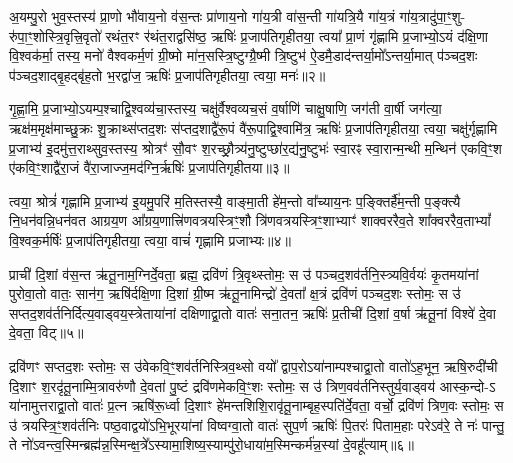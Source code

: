 {\anuvakamend[{योनौ॒ पञ्च॑दश च॥१॥}]}

अ॒यम्पु॒रो भुव॒स्तस्य॑ प्रा॒णो भौ॑वाय॒नो व॑स॒न्तः प्रा॑णाय॒नो गा॑य॒त्री वा॑स॒न्ती गा॑यत्रि॒यै गा॑य॒त्रं गा॑य॒त्रादु॑पा॒ꣳ॒शु- रु॑पा॒ꣳ॒शोस्त्रि॒वृत्त्रि॒वृतो॑ रथंत॒रꣳ र॑थंत॒राद्वसि॑ष्ठ॒ ऋषिः॑ प्र॒जाप॑तिगृहीतया॒ त्वया᳚ प्रा॒णं गृ॑ह्णामि प्र॒जाभ्यो॒\-ऽयं द॑क्षि॒णा वि॒श्वक॑र्मा॒ तस्य॒ मनो॑ वैश्वकर्म॒णं ग्री॒ष्मो मा॑न॒सस्त्रि॒ष्टुग्ग्रै॒ष्मी त्रि॒ष्टुभ॑ ऐ॒डमै॒डाद॑न्तर्या॒मो᳚\-ऽन्तर्या॒मात् प॑ञ्चद॒शः प॑ञ्चद॒शाद्बृ॒हद्बृ॑ह॒तो भ॒रद्वा॑ज॒ ऋषिः॑ प्र॒जाप॑तिगृहीतया॒ त्वया॒ मनः॑॥२॥

गृ॒ह्णा॒मि॒ प्र॒जाभ्यो॒\-ऽयम्प॒श्चाद्वि॒श्वव्य॑चा॒स्तस्य॒ चक्षु॑र्वैश्वव्यच॒सं व॒र्\mbox{}षाणि॑ चाक्षु॒षाणि॒ जग॑ती वा॒र्\mbox{}षी जग॑त्या॒ ऋक्ष॑म॒मृक्ष॑माच्छु॒क्रः शु॒क्राथ्स॑प्तद॒शः स॑प्तद॒शाद्वै॑रू॒पं वै॑रू॒पाद्वि॒श्वामि॑त्र॒ ऋषिः॑ प्र॒जाप॑तिगृहीतया॒ त्वया॒ चक्षु॑र्गृह्णामि प्र॒जाभ्य॑ इ॒दमु॑त्त॒राथ्सुव॒स्तस्य॒ श्रोत्रꣳ॑ सौ॒वꣳ श॒रच्छ्रौ॒त्र्य॑नु॒ष्टुप्छा॑र॒द्य॑नु॒ष्टुभः॑ स्वा॒रꣴ स्वा॒रान्म॒न्थी म॒न्थिन॑ एकवि॒ꣳ॒श ए॑कवि॒ꣳ॒शाद्वै॑रा॒जं वै॑रा॒जाज्ज॒मद॑ग्नि॒र्\mbox{}ऋषिः॑ प्र॒जाप॑तिगृहीतया॥३॥

त्वया॒ श्रोत्रं॑ गृह्णामि प्र॒जाभ्य॑ इ॒यमु॒परि॑ म॒तिस्तस्यै॒ वाङ्मा॒ती हे॑म॒न्तो वा᳚च्याय॒नः प॒ङ्क्तिर्\mbox{}है॑म॒न्ती प॒ङ्क्त्यै नि॒धन॑वन्नि॒धन॑वत आग्रय॒ण आ᳚ग्रय॒णात्त्रि॑णवत्रयस्त्रिꣳ॒शौ त्रि॑णवत्रयस्त्रिꣳ॒शाभ्याꣳ॑ शाक्वररैव॒ते शा᳚क्वररैव॒ता\-भ्यां᳚ वि॒श्वक॒र्मर्\mbox{}षिः॑ प्र॒जाप॑तिगृहीतया॒ त्वया॒ वाचं॑ गृह्णामि प्रजाभ्यः॥४॥

{\anuvakamend[{त्वया॒ मनो॑ ज॒मद॑ग्नि॒र्\mbox{}ऋषिः॑ प्र॒जाप॑तिगृहीतया त्रि॒ꣳ॒शच्च॑॥२॥}]}

प्राची॑ दि॒शां व॑स॒न्त ऋ॑तू॒नाम॒ग्निर्दे॒वता॒ ब्रह्म॒ द्रवि॑णं त्रि॒वृथ्स्तोमः॒ स उ॑ पञ्चद॒शव॑र्तनि॒स्त्र्यवि॒र्वयः॑ कृ॒तमया॑नां पुरोवा॒तो वातः॒ सान॑ग॒ ऋषि॑र्दक्षि॒णा दि॒शां ग्री॒ष्म ऋ॑तू॒नामिन्द्रो॑ दे॒वता᳚ क्ष॒त्रं द्रवि॑णं पञ्चद॒शः स्तोमः॒ स उ॑ सप्तद॒शव॑र्तनिर्दित्य॒वाड्वय॒स्त्रेताया॑नां दक्षिणाद्वा॒तो वातः॑ सना॒तन॒ ऋषिः॑ प्र॒तीची॑ दि॒शां व॒र्\mbox{}षा ऋ॑तू॒नां विश्वे॑ दे॒वा दे॒वता॒ विट्॥५॥

द्रवि॑णꣳ सप्तद॒शः स्तोमः॒ स उ॑वेकवि॒ꣳ॒शव॑र्तनिस्त्रिव॒थ्सो वयो᳚ द्वाप॒रो\-ऽया॑नाम्पश्चाद्वा॒तो वातो॑\-ऽह॒भून॒ ऋषि॒रुदी॑ची दि॒शाꣳ श॒रदृ॑तू॒नाम्मि॒त्रावरु॑णौ दे॒वता॑ पु॒ष्टं द्रवि॑णमेकवि॒ꣳ॒शः स्तोमः॒ स उ॑ त्रिण॒वव॑र्तनिस्तुर्य॒वाड्वय॑ आस्क॒न्दो-\-ऽ या॑नामुत्तराद्वा॒तो वातः॑ प्र॒त्न ऋषि॑रू॒र्ध्वा दि॒शाꣳ हे॑मन्तशिशि॒रावृ॑तू॒नाम्बृह॒स्पति॑र्दे॒वता॒ वर्चो॒ द्रवि॑णं त्रिण॒वः स्तोमः॒ स उ॑ त्रयस्त्रि॒ꣳ॒शव॑र्तनिः पष्ठ॒वाद्वयो॑\-ऽभि॒भूरया॑नां विष्वग्वा॒तो वातः॑ सुप॒र्ण ऋषिः॑ पि॒तरः॑ पिताम॒हाः परे\-ऽव॑रे॒ ते नः॑ पान्तु॒ ते नो॑\-ऽवन्त्व॒स्मिन्ब्रह्म॑न्न॒स्मिन्क्ष॒त्रे᳚\-ऽस्यामा॒शिष्य॒स्याम्पु॑रो॒धाया॑म॒स्मिन्कर्म॑न्न॒स्यां दे॒वहू᳚त्याम्॥६॥

